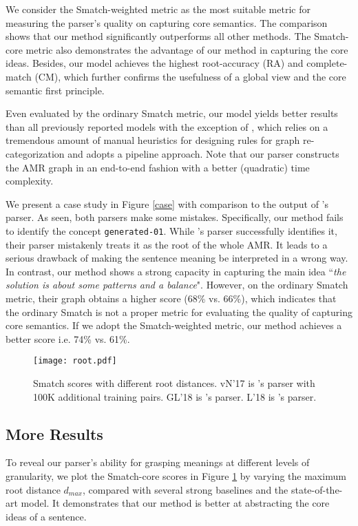 \documentclass[11pt,a4paper]{article}
\begin{document}
	We consider the Smatch-weighted metric as the most suitable metric for measuring the parser's quality on capturing core semantics. The comparison shows that our method significantly outperforms all other methods. The Smatch-core metric also demonstrates the advantage of our method in capturing the core ideas. Besides, our model achieves the highest root-accuracy (RA) and complete-match (CM), which further confirms the usefulness of a global view and the core semantic first principle.
	
	Even evaluated by the ordinary Smatch metric, our model yields better results than all previously reported models with the exception of , which relies on a tremendous amount of manual heuristics for designing rules for graph re-categorization and adopts a pipeline approach. Note that our parser constructs the AMR graph in an end-to-end fashion with a better (quadratic) time complexity.
	
	We present a case study in Figure \ref{case} with comparison to the output of 's parser. As seen, both parsers make some mistakes. Specifically, our method fails to identify the concept \texttt{generated-01}. While 's parser successfully identifies it, their parser mistakenly treats it as the root of the whole AMR. It leads to a serious drawback of making the sentence meaning be interpreted in a wrong way. In contrast, our method shows a strong capacity in capturing the main idea ``\textit{the solution is about some patterns and a balance}". However, on the ordinary Smatch metric, their graph obtains a higher score (68\% vs. 66\%), which indicates that the ordinary Smatch is not a proper metric for evaluating the quality of capturing core semantics. If we adopt the Smatch-weighted metric, our method achieves a better score i.e. 74\% vs. 61\%.
	\begin{figure}[t]
		\centering
		\texttt{[image: root.pdf]}
		\caption{Smatch scores with different root distances. vN’17 is 's parser with 100K additional training pairs. GL'18 is 's parser. L'18 is 's parser.}
		\label{root}
	\end{figure}
	\subsection{More Results}
	\label{sibling}
	To reveal our parser's ability for grasping meanings at different levels of granularity, we plot the Smatch-core scores in Figure \ref{root}  by varying the maximum root distance $d_{max}$, compared with several strong baselines and the state-of-the-art model. It demonstrates that our method is better at abstracting the core ideas of a sentence.
\end{document}
